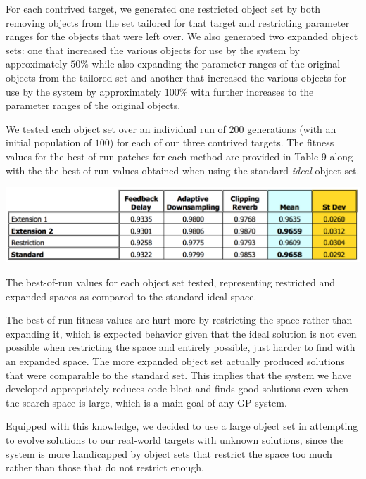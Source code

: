 \documentclass[12pt]{report} 	%
\numberwithin{figure}{chapter}
\numberwithin{table}{chapter}
\numberwithin{equation}{chapter}
\begin{document}
\begin{flushleft}
For each contrived target, we generated one restricted object set by both removing objects from the set tailored for that target and restricting parameter ranges for the objects that were left over. We also generated two expanded object sets: one that increased the various objects for use by the system by approximately $50\%$ while also expanding the parameter ranges of the original objects from the tailored set and another that increased the various objects for use by the system by approximately $100\%$ with further increases to the parameter ranges of the original objects.

We tested each object set over an individual run of $200$ generations (with an initial population of $100$) for each of our three contrived targets. The fitness values for the best-of-run patches for each method are provided in Table 9 along with the the best-of-run values obtained when using the standard \textit{ideal} object set.
\begin{table}[h!]
\begin{center}
\includegraphics[scale=0.6,width=\linewidth]{ExpansionRestrictionTable}
\caption[Restriction/expansion best-of-run values]{The best-of-run values for each object set tested, representing restricted and expanded spaces as compared to the standard ideal space.}
\end{center}
\end{table}

The best-of-run fitness values are hurt more by restricting the space rather than expanding it, which is expected behavior given that the ideal solution is not even possible when restricting the space and entirely possible, just harder to find with an expanded space. The more expanded object set actually produced solutions that were comparable to the standard set. This implies that the system we have developed appropriately reduces code bloat and finds good solutions even when the search space is large, which is a main goal of any GP system. 

Equipped with this knowledge, we decided to use a large object set in attempting to evolve solutions to our real-world targets with unknown solutions, since the system is more handicapped by object sets that restrict the space too much rather than those that do not restrict enough.


\end{flushleft}
\end{document}
